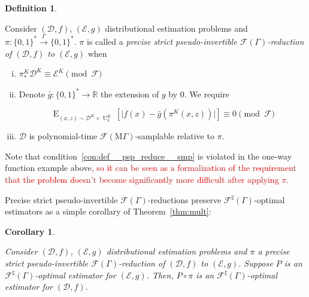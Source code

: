 \documentclass[11pt]{article}
\numberwithin{equation}{section}
\theoremstyle{definition}
\newtheorem{definition}{Definition}[section]
\theoremstyle{plain}
\newtheorem{corollary}{Corollary}[section]
\newcommand{\Bool}{\{0,1\}}
\newcommand{\Words}{{\Bool^*}}
\DeclareMathOperator{\E}{E}
\DeclareMathOperator{\Un}{U}
\newcommand{\Reals}{\mathbb{R}}
\newcommand{\Abs}[1]{\lvert #1 \rvert}
\newcommand{\Dist}{\mathcal{D}}
\newcommand{\MGrow}{\mathrm{M}\Gamma}
\newcommand{\Fall}{\mathcal{F}}
\newcommand{\EG}{\Fall(\Gamma)}
\newcommand{\ESG}{\Fall^\sharp(\Gamma)}
\newcommand{\EMG}{\Fall(\MGrow)}
\newcommand{\Scheme}{\xrightarrow{\Gamma}}
\begin{document}
\begin{samepage}
\begin{definition}
\label{def:psp_reduce}

Consider $(\Dist,f)$, $(\mathcal{E},g)$ distributional estimation problems and ${\pi: \Words \Scheme \Words}$. $\pi$ is called a \emph{precise strict pseudo-invertible $\EG$-reduction of $(\Dist,f)$ to $(\mathcal{E},g)$} when

\begin{enumerate}[(i)]

\item\label{con:def__psp_reduce__dist} $\pi_*^K\Dist^{K} \equiv \mathcal{E}^{K} \pmod \Fall$

\item\label{con:def__psp_reduce__fun} Denote ${\bar{g}: \Words \rightarrow \Reals}$ the extension of $g$ by 0. We require

\[\E_{(x,z) \sim \Dist^{K} \times \Un_\pi^{K}}[\Abs{f(x)-\bar{g}(\pi^{K}(x,z))}] \equiv 0 \pmod \Fall\]

\item\label{con:def__psp_reduce__smp} $\Dist$ is polynomial-time $\EMG$-samplable relative to $\pi$.

\end{enumerate}

\end{definition}
\end{samepage}

Note that condition~\ref{con:def__psp_reduce__smp} is violated in the one-way function example above\textcolor{red}{, so it can be seen as a formalization of the requirement that the problem doesn't become significantly more difficult after applying $\pi$.}

Precise strict pseudo-invertible $\EG$-reductions preserve $\ESG$-optimal estimators as a simple corollary of Theorem~\ref{thm:mult}:

\begin{samepage}
\begin{corollary}
\label{crl:psp_reduce_sharp}

Consider $(\Dist,f)$, $(\mathcal{E},g)$ distributional estimation problems and $\pi$ a precise strict pseudo-invertible $\EG$-reduction of $(\Dist, f)$ to $(\mathcal{E}, g)$. Suppose $P$ is an $\ESG$-optimal estimator for $(\mathcal{E}, g)$. Then, $P \circ \pi$ is an $\ESG$-optimal estimator for $(\Dist, f)$.

\end{corollary}
\end{samepage}
\end{document}
